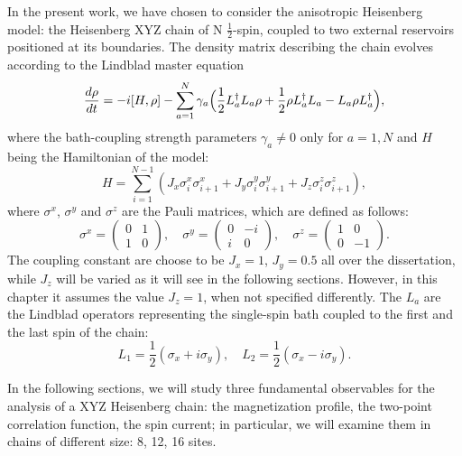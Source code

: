 In the present work, we have chosen to consider the anisotropic Heisenberg model: the Heisenberg XYZ chain of N $\frac{1}{2}$-spin, coupled to two external reservoirs positioned at its boundaries. The density matrix describing the chain evolves according to the Lindblad master equation
\begin{equation}
    \frac{d\rho}{dt} = -i[H, \rho] - \sum_{a=1}^{N}\gamma_a\Bigl(\frac{1}{2}L_a^{\dagger}L_a\rho + \frac{1}{2}\rho L_a^{\dagger}L_a - L_a\rho L_a^{\dagger}\Bigl),
\end{equation}
where the bath-coupling strength parameters $\gamma_a \neq 0$ only for $a = 1, N$ and
$H$ being the Hamiltonian of the model:
\begin{equation}
\label{ham_chain}
    H = \sum_{i = 1}^{N-1} (J_x \sigma_i^x \sigma_{i+1}^x + J_y \sigma_i^y \sigma_{i+1}^y + J_z \sigma_i^z \sigma_{i+1}^z),
\end{equation}
where $\sigma^x$, $\sigma^y$ and $\sigma^z$ are the Pauli matrices, which are defined as follows:
\begin{equation}
\sigma^x = 
    \begin{pmatrix}
        0 & 1 \\
        1 & 0
    \end{pmatrix}
    , \quad \sigma^y = 
    \begin{pmatrix}
        0 & -i \\
        i & 0
    \end{pmatrix}
    , \quad \sigma^z = 
    \begin{pmatrix}
        1 & 0 \\
        0 & -1
    \end{pmatrix}
    .
\end{equation}
The coupling constant are choose to be $J_x = 1$, $J_y = 0.5$ all over the dissertation, while $J_z$ will be varied as it will see in the following sections. However, in this chapter it assumes the value $J_z = 1$, when not specified differently.
The $L_a$ are the Lindblad operators representing the single-spin bath coupled to the first and the last spin of the chain:
\begin{equation}
\label{dissipators}
    L_1 = \frac{1}{2}(\sigma_x + i\sigma_y), \quad L_2 = \frac{1}{2}(\sigma_x - i\sigma_y).
\end{equation}


In the following sections, we will study three fundamental observables for the analysis of a XYZ Heisenberg chain: the magnetization profile, the two-point correlation function, the spin current; in particular, we will examine them in chains of different size: 8, 12, 16 sites. 

